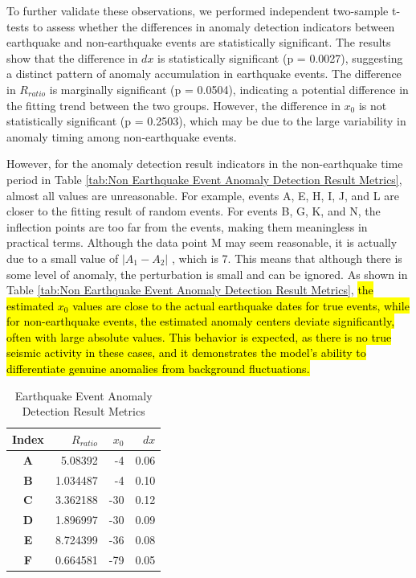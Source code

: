 \documentclass[3p,authoryear,preprint,12pt]{elsarticle}
\begin{document}
{To further validate these observations, we performed independent two-sample t-tests to assess whether the differences in anomaly detection indicators between earthquake and non-earthquake events are statistically significant. The results show that the difference in $dx$ is statistically significant (p = 0.0027), suggesting a distinct pattern of anomaly accumulation in earthquake events. The difference in $R_{ratio}$ is marginally significant (p = 0.0504), indicating a potential difference in the fitting trend between the two groups. However, the difference in $x_0$ is not statistically significant (p = 0.2503), which may be due to the large variability in anomaly timing among non-earthquake events.}

{However, for the anomaly detection result indicators} in the non-earthquake time period in Table \ref{tab:Non Earthquake Event Anomaly Detection Result Metrics}, almost all values are unreasonable. For example, events A, E, H, I, J, and L are closer to the fitting result of random events. For events B, G, K, and N, the inflection points are too far from the events, making them meaningless in practical terms. Although the data point M may seem reasonable, it is actually due to a small value of $\vert A_1 - A_2 \vert$ , which is 7. This means that although there is some level of anomaly, the perturbation is small and can be ignored. As shown in Table \ref{tab:Non Earthquake Event Anomaly Detection Result Metrics}, \hl{the estimated $x_0$ values are close to the actual earthquake dates for true events, while for non-earthquake events, the estimated anomaly centers deviate significantly, often with large absolute values. This behavior is expected, as there is no true seismic activity in these cases, and it demonstrates the model’s ability to differentiate genuine anomalies from background fluctuations.}
\begin{table}[htbp]
	\caption{Earthquake Event Anomaly Detection Result Metrics}
	\label{tab:Earthquake Event Anomaly Detection Result Metrics}
	\centering
	\begin{tabular}{crrr}
		\toprule
		\textbf{Index}& $R_{ratio}$ & $x_0$       & $dx$    \\
		\midrule
		\textbf{A} & 5.08392     & -4     & 0.06 \\
		\textbf{B} & 1.034487    & -4     & 0.10 \\
		\textbf{C} & 3.362188    & -30    & 0.12 \\
		\textbf{D} & 1.896997    & -30    & 0.09 \\
		\textbf{E} & 8.724399    & -36    & 0.08 \\
		\textbf{F} & 0.664581    & -79    & 0.05 \\
		\bottomrule
	\end{tabular}
\end{table}
\end{document}
